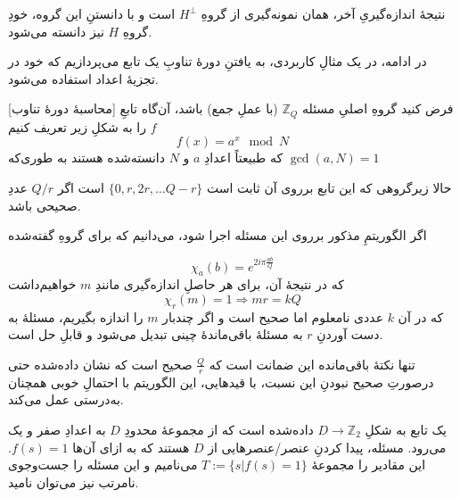نتیجهٔ اندازه‌گیریِ آخر، همان نمونه‌گیری از گروهِ \(H^\perp\) است و با دانستنِ این گروه، خودِ گروهِ \(H\) نیز دانسته می‌شود.

در ادامه، در یک مثالِ کاربردی، به یافتنِ دورهٔ تناوبِ یک تابع می‌پردازیم که خود در تجزیهٔ اعداد استفاده می‌شود.

[محاسبهٔ دورهٔ تناوب]
فرض کنید گروهِ اصلیِ مسئله
\(\mathbb{Z}_{Q}\)
(با عملِ جمع) باشد، آن‌گاه تابعِ \(f\) را به شکلِ زیر تعریف کنیم
\begin{equation}
 f(x) = a^x \mod N
\end{equation}
که طبیعتاً اعدادِ \(a\) و \(N\) دانسته‌شده هستند به طوری‌که 
\(\gcd(a, N) = 1\)

حالا زیرگروهی که این تابع برروی آن ثابت است
\(\{ 0, r, 2r, \dots Q - r \}\)
است اگر \(Q/r\) عددِ صحیحی باشد.

اگر الگوریتمِ مذکور برروی این مسئله اجرا شود، می‌دانیم که برای گروهِ گفته‌شده

\begin{equation}
    \chi_a(b) = e^{2i\pi\frac{ab}{Q}}
\end{equation}
که در نتیجهٔ آن، برای هر حاصلِ اندازه‌گیری مانندِ \(m\) خواهیم‌داشت
\begin{equation}
    \chi_r(m) = 1 \Rightarrow mr = kQ
\end{equation}
که در آن \(k\) عددی نامعلوم اما صحیح است و اگر چندبار \(m\) را اندازه بگیریم، مسئلهٔ به دست آوردنِ \(r\) به مسئلهٔ باقی‌ماندهٔ چینی تبدیل می‌شود و قابلِ حل است.

تنها نکتهٔ باقی‌مانده این ضمانت است که \(\frac{Q}{r}\) صحیح است که نشان داده‌شده حتی درصورتِ صحیح نبودنِ این نسبت، با قیدهایی، این الگوریتم با احتمالِ خوبی همچنان به‌درستی عمل می‌کند.


یک تابع به شکلِ
$D \to \mathbb{Z}_2$
داده‌شده است که از مجموعهٔ محدودِ $D$ به اعدادِ صفر و یک می‌رود.
مسئله، پیدا کردنِ عنصر/عنصرهایی از $D$ هستند که به ازای آن‌ها
$f(s) = 1$.
این مقادیر را مجموعهٔ 
$T := \{ s | f(s) = 1\}$
 می‌نامیم و
این مسئله را جست‌وجوی نامرتب نیز می‌توان نامید.

